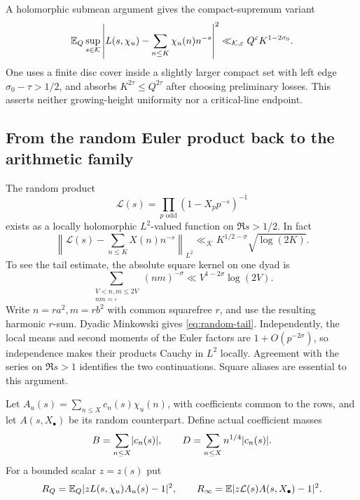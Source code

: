 A holomorphic submean argument gives the compact-supremum variant
\[
 \mathbb E_Q\sup_{s\in\mathcal K}
 \left|L(s,\chi_u)-\sum_{n\le K}\chi_u(n)n^{-s}\right|^2
 \ll_{\mathcal K,\varepsilon}Q^\varepsilon K^{1-2\sigma_0}.
\]
One uses a finite disc cover inside a slightly larger compact set with left edge $\sigma_0-\tau>1/2$, and absorbs $K^{2\tau}\le Q^{2\tau}$ after choosing preliminary losses. This asserts neither growing-height uniformity nor a critical-line endpoint.

\subsection{From the random Euler product back to the arithmetic family}
The random product
\[
 \mathcal L(s)=\prod_{p\text{ odd}}(1-X_pp^{-s})^{-1}
\]
exists as a locally holomorphic $L^2$-valued function on $\Re s>1/2$. In fact
\begin{equation}\label{eq:random-tail}
 \left\|\mathcal L(s)-\sum_{n\le K}X(n)n^{-s}\right\|_{L^2}
 \ll_{\mathcal K}K^{1/2-\sigma}\sqrt{\log(2K)}.
\end{equation}
To see the tail estimate, the absolute square kernel on one dyad is
\[
 \sum_{\substack{V<n,m\le2V\\nm=\square}}(nm)^{-\sigma}
 \ll V^{1-2\sigma}\log(2V).
\]
Write $n=ra^2,m=rb^2$ with common squarefree $r$, and use the resulting harmonic $r$-sum. Dyadic Minkowski gives \eqref{eq:random-tail}. Independently, the local means and second moments of the Euler factors are $1+O(p^{-2\sigma})$, so independence makes their products Cauchy in $L^2$ locally. Agreement with the series on $\Re s>1$ identifies the two continuations. Square aliases are essential to this argument.

Let $A_u(s)=\sum_{n\le X}c_n(s)\chi_u(n)$, with coefficients common to the rows, and let $A(s,X_\bullet)$ be its random counterpart. Define actual coefficient masses
\[
 B=\sum_{n\le X}\lvert c_n(s)\rvert,\qquad
 D=\sum_{n\le X}n^{1/4}\lvert c_n(s)\rvert.
\]
For a bounded scalar $z=z(s)$ put
\[
 R_Q=\mathbb E_Q\lvert zL(s,\chi_u)A_u(s)-1\rvert^2,\qquad
 R_\infty=\mathbb E\lvert z\mathcal L(s)A(s,X_\bullet)-1\rvert^2.
\]

